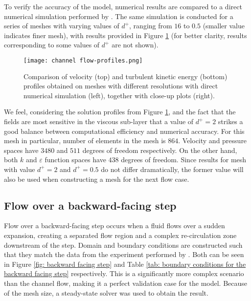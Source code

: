 To verify the accuracy of the model, numerical results are compared to a direct numerical simulation performed by \cite{lee_direct_2015}. The same simulation is conducted for a series of meshes with varying values of \(d^+\), ranging from \(16\) to \(0.5\) (smaller value indicates finer mesh), with results provided in Figure \ref{fig: channel flow profiles} (for better clarity, results corresponding to some values of \(d^+\) are not shown). 

\begin{figure}[htbp]
    \centering
    \texttt{[image: channel flow-profiles.png]}
    \captionsetup{width=0.85\textwidth}
    \caption{Comparison of velocity (top) and turbulent kinetic energy (bottom) profiles obtained on meshes with different resolutions with direct numerical simulation (left), together with close-up plots (right).}
    \label{fig: channel flow profiles}
\end{figure}

We feel, considering the solution profiles from Figure \ref{fig: channel flow profiles}, and the fact that the fields are most sensitive in the viscous sub-layer that a value of \(d^+ = 2\) strikes a good balance between computational efficiency and numerical accuracy. For this mesh in particular, number of elements in the mesh is \(864\). Velocity and pressure spaces have \(3480\) and \(511\) degrees of freedom respectively. On the other hand, both \(k\) and \(\varepsilon\) function spaces have \(438\) degrees of freedom. Since results for mesh with value \(d^+ = 2\) and \(d^+ = 0.5\) do not differ dramatically, the former value will also be used when constructing a mesh for the next flow case.  

\subsection{Flow over a backward-facing step}

Flow over a backward-facing step occurs when a fluid flows over a sudden expansion, creating a separated flow region and a complex re-circulation zone downstream of the step. Domain and boundary conditions are constructed such that they match the data from the experiment performed by \cite{driver_features_1985}. Both can be seen in Figure \ref{fig: backward facing step} and Table \ref{tab: boundary conditions for the backward facing step} respectively. This is a significantly more complex scenario than the channel flow, making it a perfect validation case for the model. Because of the mesh size, a steady-state solver was used to obtain the result.    

